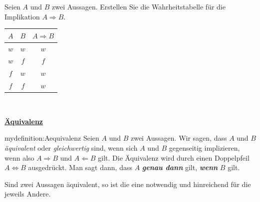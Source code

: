 \begin{myexercise}\label{implikation}%
	\noindent
	Seien $A$ und $B$ zwei Aussagen. Erstellen Sie die Wahrheitstabelle für die Implikation $A \Rightarrow B$.
	\vspace{1cm}
\end{myexercise}
\begin{myanswer}
	\noindent
	\begin{table}[H]
		\begin{center}
			\begin{tabular}{c|c|c}
				$A$ & $B$ & $A\Rightarrow B$ \\ \hline
				$w$ & $w$ & $w$              \\
				$w$ & $f$ & $f$              \\
				$f$ & $w$ & $w$              \\
				$f$ & $f$ & $w$
			\end{tabular}
		\end{center}
	\end{table}
	\noindent
	\\
\end{myanswer}



\noindent
\textbf{\underline{Äquivalenz}}\\
\begin{mydefinition}[Äquivalenz]{mydefinition:Aequivalenz}
Seien $A$ und $B$ zwei Aussagen. Wir sagen, dass $A$ und $B$ \textit{äquivalent} oder \textit{gleichwertig} sind, wenn sich $A$ und $B$ gegenseitig implizieren, wenn also $A \Rightarrow B$ und $A \Leftarrow B$ gilt. Die Äquivalenz wird durch einen Doppelpfeil $A \Leftrightarrow B$ ausgedrückt. Man sagt dann, dass $A$ \textit{\textbf{genau dann}} gilt, \textit{\textbf{wenn}} $B$ gilt.
\end{mydefinition}
Sind zwei Aussagen äquivalent, so ist die eine notwendig und hinreichend für die jeweils Andere.

